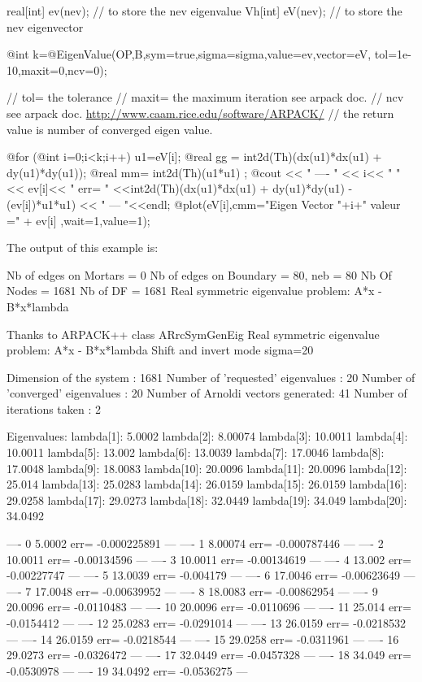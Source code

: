 \documentclass[a4paper,twoside,12pt]{book}
\begin{document}
\begin{example}
real[int] ev(nev); // to store the  nev eigenvalue
Vh[int] eV(nev);   // to store the nev eigenvector 

@int k=@EigenValue(OP,B,sym=true,sigma=sigma,value=ev,vector=eV,
                   tol=1e-10,maxit=0,ncv=0);

//   tol= the tolerance \hfilll
//   maxit= the maximum iteration see arpack doc.\hfilll
//   ncv   see arpack doc. \url{http://www.caam.rice.edu/software/ARPACK/}\hfilll
//  the return value is number of converged eigen value.\hfilll

@for (@int i=0;i<k;i++)
{
  u1=eV[i];
  @real gg = int2d(Th)(dx(u1)*dx(u1) + dy(u1)*dy(u1));
  @real mm= int2d(Th)(u1*u1) ;
  @cout << " ---- " <<  i<< " " << ev[i]<< " err= "
       <<int2d(Th)(dx(u1)*dx(u1) + dy(u1)*dy(u1) - (ev[i])*u1*u1) << " --- "<<endl;
  @plot(eV[i],cmm="Eigen  Vector "+i+" valeur =" + ev[i]  ,wait=1,value=1);
}

\eFF

The output of this example is:

\bFF

   Nb of edges on Mortars  = 0
   Nb of edges on Boundary = 80, neb = 80
 Nb Of Nodes = 1681
 Nb of DF = 1681
Real symmetric eigenvalue problem: A*x - B*x*lambda


Thanks to ARPACK++ class ARrcSymGenEig
Real symmetric eigenvalue problem: A*x - B*x*lambda
Shift and invert mode  sigma=20

Dimension of the system            : 1681
Number of 'requested' eigenvalues  : 20
Number of 'converged' eigenvalues  : 20
Number of Arnoldi vectors generated: 41
Number of iterations taken         : 2

Eigenvalues:
  lambda[1]: 5.0002
  lambda[2]: 8.00074
  lambda[3]: 10.0011
  lambda[4]: 10.0011
  lambda[5]: 13.002
  lambda[6]: 13.0039
  lambda[7]: 17.0046
  lambda[8]: 17.0048
  lambda[9]: 18.0083
  lambda[10]: 20.0096
  lambda[11]: 20.0096
  lambda[12]: 25.014
  lambda[13]: 25.0283
  lambda[14]: 26.0159
  lambda[15]: 26.0159
  lambda[16]: 29.0258
  lambda[17]: 29.0273
  lambda[18]: 32.0449
  lambda[19]: 34.049
  lambda[20]: 34.0492

 ---- 0 5.0002 err= -0.000225891 ---
 ---- 1 8.00074 err= -0.000787446 ---
 ---- 2 10.0011 err= -0.00134596 ---
 ---- 3 10.0011 err= -0.00134619 ---
 ---- 4 13.002 err= -0.00227747 ---
 ---- 5 13.0039 err= -0.004179 ---
 ---- 6 17.0046 err= -0.00623649 ---
 ---- 7 17.0048 err= -0.00639952 ---
 ---- 8 18.0083 err= -0.00862954 ---
 ---- 9 20.0096 err= -0.0110483 ---
 ---- 10 20.0096 err= -0.0110696 ---
 ---- 11 25.014 err= -0.0154412 ---
 ---- 12 25.0283 err= -0.0291014 ---
 ---- 13 26.0159 err= -0.0218532 ---
 ---- 14 26.0159 err= -0.0218544 ---
 ---- 15 29.0258 err= -0.0311961 ---
 ---- 16 29.0273 err= -0.0326472 ---
 ---- 17 32.0449 err= -0.0457328 ---
 ---- 18 34.049 err= -0.0530978 ---
 ---- 19 34.0492 err= -0.0536275 ---
\eFF

\end{example}
\end{document}
